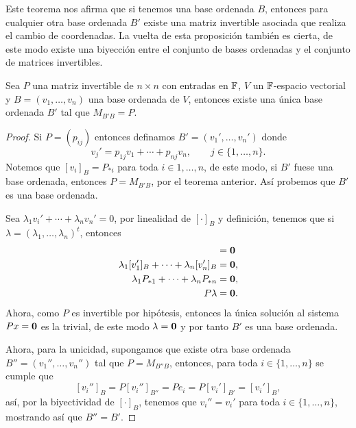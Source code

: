 Este teorema nos afirma que si tenemos una base ordenada $B$, entonces para cualquier otra base ordenada $B'$ existe una matriz invertible asociada que realiza el cambio de coordenadas. La vuelta de esta proposición también es cierta, de este modo existe una biyección entre el conjunto de bases ordenadas y el conjunto de matrices invertibles.

\begin{prop}\label{prop:ExBase}
  Sea $P$ una matriz invertible de $n\times n$ con entradas en $\mathbb{F}$, $V$ un $\mathbb{F}$-espacio vectorial y $B = (v_1, \ldots, v_n)$ una base ordenada de $V$, entonces existe una única base ordenada $B'$ tal que $M_{B'B} = P$.
\end{prop}
\begin{proof}
  Si $P = (p_{ij})$ entonces definamos $B' = (v_1', \ldots, v_n')$ donde
    \[ v_j' = p_{1j}v_1 + \cdots +  p_{nj}v_n,     \qquad j \in \{1,\ldots, n\}. \]
  Notemos que $[v_i]_B = P_{*i}$ para toda $i \in 1,\ldots,n$, de este modo, si $B'$ fuese una base ordenada, entonces $P = M_{B'B}$, por el teorema anterior. Así probemos que $B'$ es una base ordenada.

  Sea $\lambda_1 v_i' + \cdots + \lambda_n v_n' = 0$, por linealidad de $[\cdot]_B$ y definición, tenemos que si $\lambda = (\lambda_1, \ldots, \lambda_n)^t$, entonces
  \begin{align*}
    [\lambda_1 v_i' + \cdots + \lambda_n v_n'] &= \bec 0 \\
    \lambda_1 [v_1']_B + \cdots + \lambda_n [v_n']_B &= \bec 0 ,\\
    \lambda_1 P_{*1} + \cdots + \lambda_n P_{*n} &= \bec 0 ,\\
    P\lambda &= \bec 0.
  \end{align*}
  Ahora, como $P$ es invertible por hipótesis, entonces la única solución al sistema $Px = \mathbf{0}$ es la trivial, de este modo $\lambda = \mathbf{0}$ y por tanto $B'$ es una base ordenada.

  Ahora, para la unicidad, supongamos que existe otra base ordenada $B'' = (v_1'', \ldots, v_n'')$ tal que $P = M_{B''B}$, entonces, para toda $i \in \{1,\ldots,n\}$ se cumple que
  \[ [v_i'']_B =  P[v_i'']_{B''} = Pe_i = P[v_i']_{B'} = [v_i']_B, \]
  así, por la biyectividad de $[\cdot]_B$, tenemos que $v_i'' = v_i'$ para toda $i \in \{1,\ldots,n\}$, mostrando así que $B'' = B'$.
\end{proof}

